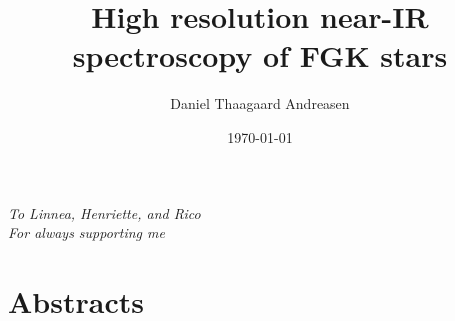 \documentclass[a4paper,
11pt,
twoside,
]{memoir}
\begin{document}
    \title{High resolution near-IR spectroscopy of FGK stars}
    \author{Daniel Thaagaard Andreasen}
    \date{\today}
    \maketitle
\frontmatter
%


\cleardoublepage
\thispagestyle{empty}

\begin{adjustwidth}{3em}{4em}
   \centering \huge \itshape
   To Linnea, Henriette, and Rico\\For always supporting me
\end{adjustwidth}
\cleardoublepage

\tableofcontents  %
\thispagestyle{empty}

\newpage
\chapter*{Abstracts}
\newpage
\listoffigures
\listoftables
\mainmatter






\thispagestyle{empty}


%    


\backmatter


\nocite{} %
\end{document}
